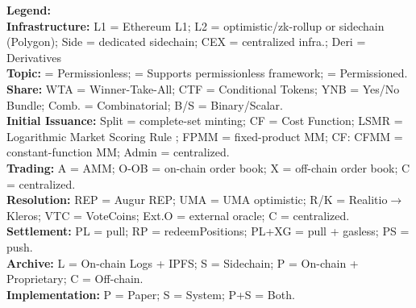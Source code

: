 \begin{table}[t]
\vspace{0.30em}
\begin{minipage}{\textwidth}
\footnotesize
\textbf{Legend:} \\
\textbf{Infrastructure:} L1 = Ethereum L1; L2 = optimistic/zk-rollup or sidechain (Polygon); Side = dedicated sidechain; CEX = centralized infra.; Deri = Derivatives\\
\textbf{Topic:} \Circle = Permissionless; \LEFTcircle = Supports permissionless framework; \CIRCLE = Permissioned. \\
\textbf{Share:} WTA = Winner-Take-All; CTF = Conditional Tokens; YNB = Yes/No Bundle; Comb. = Combinatorial; B/S = Binary/Scalar. \\
\textbf{Initial Issuance:} Split = complete-set minting; CF = Cost Function; LSMR = Logarithmic Market Scoring Rule ; FPMM = fixed-product MM; CF: CFMM = constant-function MM; Admin = centralized. \\
\textbf{Trading:} A = AMM; O-OB = on-chain order book; X = off-chain order book; C = centralized. \\
\textbf{Resolution:} REP = Augur REP; UMA = UMA optimistic; R/K = Realitio$\rightarrow$Kleros; VTC = VoteCoins; Ext.O = external oracle; C = centralized. \\
\textbf{Settlement:} PL = pull; RP = redeemPositions; PL+XG = pull + gasless; PS = push. \\
\textbf{Archive:} L = On-chain Logs + IPFS; S = Sidechain; P = On-chain + Proprietary; C = Off-chain. \\
\textbf{Implementation:} P = Paper; S = System; P+S = Both.
\end{minipage}
\end{table}


